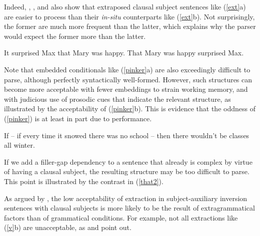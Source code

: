 \documentclass[output=paper
                ,modfonts
                ,nonflat
	        ,collection
	        ,collectionchapter
	        ,collectiontoclongg
 	        ,biblatex
                ,babelshorthands
                ,newtxmath
                ,draftmode
                ,colorlinks, citecolor=brown
]{./langsci/langscibook}
\begin{document}
\eal  \label{exps}
\zl


\noindent
  Indeed, \citet{fodor67},  \citet{bever}, and \citet{frazier88} also
 show that extraposed clausal subject sentences
 like (\ref{ext}a) are easier to process than
their \textit{in-situ} counterparts like (\ref{ext}b). 
Not surprisingly,  the former are much more frequent than the latter,
which  explains why the parser would expect the former more than the latter.


\eal  \label{ext}
\ex It surprised Max that Mary was happy. 
\ex That Mary was happy surprised Max.
\zl






\noindent
Note that embedded conditionals like (\ref{pinker}a) are also exceedingly 
difficult to parse, although perfectly syntactically well-formed.
However,   such structures can become more acceptable with fewer embeddings to strain
working memory, and with judicious use of prosodic cues that indicate  the relevant structure, as illustrated by  the acceptability of (\ref{pinker}b).
This is  evidence that the oddness of (\ref{pinker}) is
at least in part due to performance. 


\ea \label{pinker} If -- if every time it snowed there was no school -- then there wouldn't be classes all winter.
\z 


  
  
  
  If we add a filler-gap dependency to a sentence that already is complex by
  virtue of having  a clausal  subject, the resulting structure
  may be too difficult to parse.  This   point is illustrated by
  the contrast in (\ref{that2}).



\eal \label{that2}
\zl


\noindent
As argued by \citet{dubinsky2009}, the low acceptability
 of extraction in subject-auxiliary inversion sentences with clausal subjects 
  is more likely to be the result of extragrammatical factors than of grammatical conditions.
For example,  not all extractions like (\ref{v}b) are unacceptable, as
\citet[382--387]{delahunty} and
\citet[115]{dubinsky2009} point out. 
\end{document}
